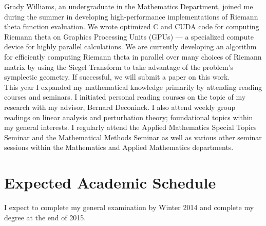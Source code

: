 \documentclass[11pt]{amsart}
\begin{document}
Grady Williams, an undergraduate in the Mathematics Department, joined
me during the summer in developing high-performance implementations of
Riemann theta function evaluation. We wrote optimized C and CUDA code
for computing Riemann theta on Graphics Processing Units (GPUs) --- a
specialized compute device for highly parallel calculations. We are
currently developing an algorithm for efficiently computing Riemann
theta in parallel over many choices of Riemann matrix by using the
Siegel Transform to take advantage of the problem's symplectic
geometry. If successful, we will submit a paper on this work. \\

This year I expanded my mathematical knowledge primarily by attending
reading courses and seminars. I initiated personal reading courses on
the topic of my research with my advisor, Bernard Deconinck. I also
attend weekly group readings on linear analysis and perturbation
theory; foundational topics within my general interests. I regularly
attend the Applied Mathematics Special Topics Seminar and the
Mathematical Methods Seminar as well as various other seminar sessions
within the Mathematics and Applied Mathematics departments.

\section*{Expected Academic Schedule}

I expect to complete my general examination by Winter 2014 and complete
my degree at the end of 2015.
\end{document}
